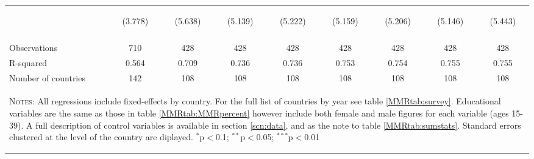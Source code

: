 \begin{landscape}
\begin{table}[htpb!]
\begin{center}
\begin{tabular}{lcccccccc}
&\begin{footnotesize}(3.778)\end{footnotesize}&\begin{footnotesize}(5.638)\end{footnotesize}&\begin{footnotesize}(5.139)\end{footnotesize}&\begin{footnotesize}(5.222)\end{footnotesize}&\begin{footnotesize}(5.159)\end{footnotesize}&\begin{footnotesize}(5.206)\end{footnotesize}&\begin{footnotesize}(5.146)\end{footnotesize}&\begin{footnotesize}(5.443)\end{footnotesize}\\
&&&&&&&&\\Observations&710&428&428&428&428&428&428&428\\
R-squared&0.564&0.709&0.736&0.736&0.753&0.754&0.755&0.755\\
Number of countries&142&108&108&108&108&108&108&108\\
\midrule
\multicolumn{9}{p{20cm}}{\begin{footnotesize}\textsc{Notes:} All regressions include fixed-effects by country. For the full list of countries by year see table \ref{MMRtab:survey}. Educational variables are the same as those in table \ref{MMRtab:MMRpercent} however include both female and male figures for each variable (ages 15-39). A full description of control variables is available in section \ref{scn:data}, and as the note to table \ref{MMRtab:sumstats}.  Standard errors clustered at the level of the country are diplayed.
$^{*}$p$<$0.1; $^{**}$p$<$0.05; $^{***}$p$<$0.01\end{footnotesize}} \\ \bottomrule 
\end{tabular}\end{center}\end{table}\end{landscape}
